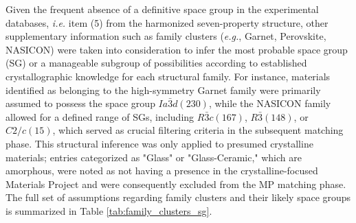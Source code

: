 \documentclass[a4paper,fleqn]{cas-sc}
\begin{document}
Given the frequent absence of a definitive space group in the experimental databases, \textit{i.e.} item (5) from the harmonized seven-property structure, other supplementary information such as family clusters (\textit{e.g.}, Garnet, Perovskite, NASICON) were taken into consideration to infer the most probable space group (SG) or a manageable subgroup of possibilities according to established crystallographic knowledge for each structural family. For instance, materials identified as belonging to the high-symmetry Garnet family were primarily assumed to possess the space group $Ia\bar{3}d (230)$, while the NASICON family allowed for a defined range of SGs, including $R\bar{3}c (167)$, $R\bar{3} (148)$, or $C2/c (15)$, which served as crucial filtering criteria in the subsequent matching phase. This structural inference was only applied to presumed crystalline materials; entries categorized as "Glass" or "Glass-Ceramic," which are amorphous, were noted as not having a presence in the crystalline-focused Materials Project and were consequently excluded from the MP matching phase. The full set of assumptions regarding family clusters and their likely space groups is summarized in Table \ref{tab:family_clusters_sg}.


\end{document}
